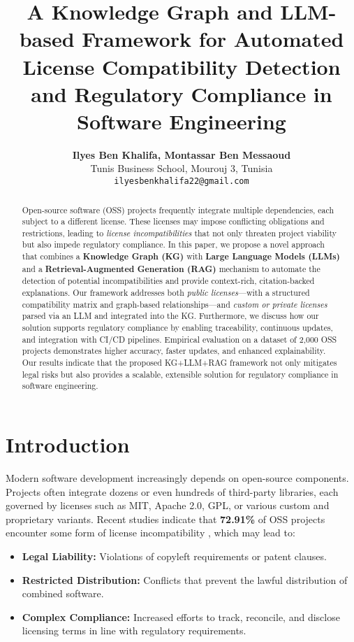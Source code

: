 \documentclass[12pt]{article}
\begin{document}
\title{\textbf{A Knowledge Graph and LLM-based Framework for Automated License Compatibility Detection and Regulatory Compliance in Software Engineering}}
\author{\textbf{Ilyes Ben Khalifa, Montassar Ben Messaoud}\\
Tunis Business School, Mourouj 3, Tunisia\\
\texttt{ilyesbenkhalifa22@gmail.com}}
\date{}
\maketitle

\begin{abstract}
Open-source software (OSS) projects frequently integrate multiple dependencies, each subject to a different license. These licenses may impose conflicting obligations and restrictions, leading to \emph{license incompatibilities} that not only threaten project viability but also impede regulatory compliance. In this paper, we propose a novel approach that combines a \textbf{Knowledge Graph (KG)} with \textbf{Large Language Models (LLMs)} and a \textbf{Retrieval-Augmented Generation (RAG)} mechanism to automate the detection of potential incompatibilities and provide context-rich, citation-backed explanations. Our framework addresses both \emph{public licenses}—with a structured compatibility matrix and graph-based relationships—and \emph{custom or private licenses} parsed via an LLM and integrated into the KG. Furthermore, we discuss how our solution supports regulatory compliance by enabling traceability, continuous updates, and integration with CI/CD pipelines. Empirical evaluation on a dataset of 2,000 OSS projects demonstrates higher accuracy, faster updates, and enhanced explainability. Our results indicate that the proposed KG+LLM+RAG framework not only mitigates legal risks but also provides a scalable, extensible solution for regulatory compliance in software engineering.
\end{abstract}

\section{Introduction}
\label{sec:intro}
Modern software development increasingly depends on open-source components. Projects often integrate dozens or even hundreds of third-party libraries, each governed by licenses such as MIT, Apache 2.0, GPL, or various custom and proprietary variants. Recent studies indicate that \textbf{72.91\%} of OSS projects encounter some form of license incompatibility \cite{vendome2017license}, which may lead to:
\begin{itemize}
    \item \textbf{Legal Liability:} Violations of copyleft requirements or patent clauses.
    \item \textbf{Restricted Distribution:} Conflicts that prevent the lawful distribution of combined software.
    \item \textbf{Complex Compliance:} Increased efforts to track, reconcile, and disclose licensing terms in line with regulatory requirements.
\end{itemize}
\end{document}
